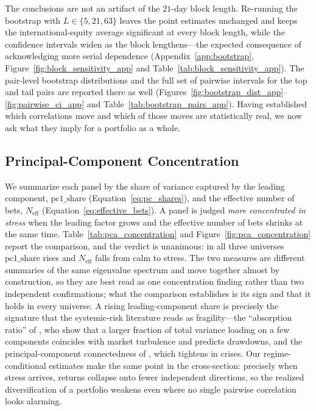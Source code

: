 The conclusions are not an artifact of the $21$-day block length. Re-running the bootstrap with $L \in \{5, 21, 63\}$ leaves the point estimates unchanged and keeps the international-equity average significant at every block length, while the confidence intervals widen as the block lengthens---the expected consequence of acknowledging more serial dependence (Appendix~\ref{app:bootstrap}, Figure~\ref{fig:block_sensitivity_app} and Table~\ref{tab:block_sensitivity_app}). The pair-level bootstrap distributions and the full set of pairwise intervals for the top and tail pairs are reported there as well (Figures~\ref{fig:bootstrap_dist_app}--\ref{fig:pairwise_ci_app} and Table~\ref{tab:bootstrap_pairs_app}). Having established which correlations move and which of those moves are statistically real, we now ask what they imply for a portfolio as a whole.

\subsection{Principal-Component Concentration}
\label{subsec:results_pca}

We summarize each panel by the share of variance captured by the leading component, $\mathrm{pc1\_share}$ (Equation~\eqref{eq:pc_shares}), and the effective number of bets, $N_{\mathrm{eff}}$ (Equation~\eqref{eq:effective_bets}). A panel is judged \emph{more concentrated in stress} when the leading factor grows and the effective number of bets shrinks at the same time. Table~\ref{tab:pca_concentration} and Figure~\ref{fig:pca_concentration} report the comparison, and the verdict is unanimous: in all three universes $\mathrm{pc1\_share}$ rises and $N_{\mathrm{eff}}$ falls from calm to stress. The two measures are different summaries of the same eigenvalue spectrum and move together almost by construction, so they are best read as one concentration finding rather than two independent confirmations; what the comparison establishes is its sign and that it holds in every universe. A rising leading-component share is precisely the signature that the systemic-risk literature reads as fragility---the ``absorption ratio'' of \citet{kritzman2011principal}, who show that a larger fraction of total variance loading on a few components coincides with market turbulence and predicts drawdowns, and the principal-component connectedness of \citet{billio2012econometric}, which tightens in crises. Our regime-conditional estimates make the same point in the cross-section: precisely when stress arrives, returns collapse onto fewer independent directions, so the realized diversification of a portfolio weakens even where no single pairwise correlation looks alarming.

